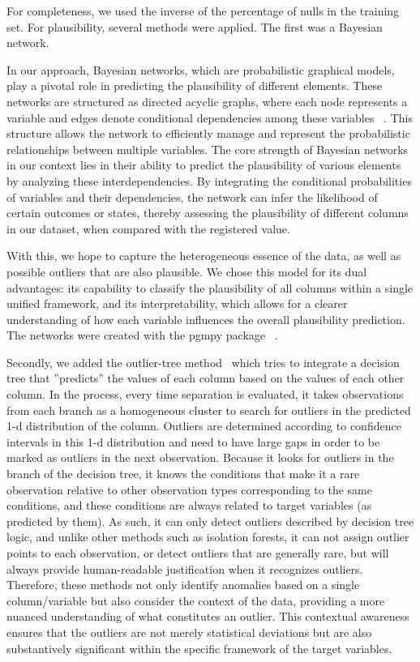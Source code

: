 For completeness, we used the inverse of the percentage of nulls in the training set. For plausibility, several methods were applied. The first was a Bayesian network. 

In our approach, Bayesian networks, which are probabilistic graphical models, play a pivotal role in predicting the plausibility of different elements. These networks are structured as directed acyclic graphs, where each node represents a variable and edges denote conditional dependencies among these variables \unskip~\cite{pearl1988probabilistic}. This structure allows the network to efficiently manage and represent the probabilistic relationships between multiple variables. The core strength of Bayesian networks in our context lies in their ability to predict the plausibility of various elements by analyzing these interdependencies. By integrating the conditional probabilities of variables and their dependencies, the network can infer the likelihood of certain outcomes or states, thereby assessing the plausibility of different columns in our dataset, when compared with the registered value. 

With this, we hope to capture the heterogeneous essence of the data, as well as possible outliers that are also plausible. We chose this model for its dual advantages: its capability to classify the plausibility of all columns within a single unified framework, and its interpretability, which allows for a clearer understanding of how each variable influences the overall plausibility prediction. The networks were created with the pgmpy package \unskip~\cite{pgmpy}. 

Secondly, we added the outlier-tree method\unskip~\cite{cortesExplainableOutlierDetection2020} which tries to integrate a decision tree that ''predicts'' the values of each column based on the values of each other column. In the process, every time separation is evaluated, it takes observations from each branch as a homogeneous cluster to search for outliers in the predicted 1-d distribution of the column. Outliers are determined according to confidence intervals in this 1-d distribution and need to have large gaps in order to be marked as outliers in the next observation. Because it looks for outliers in the branch of the decision tree, it knows the conditions that make it a rare observation relative to other observation types corresponding to the same conditions, and these conditions are always related to target variables (as predicted by them).  As such, it can only detect outliers described by decision tree logic, and unlike other methods such as isolation forests, it can not assign outlier points to each observation, or detect outliers that are generally rare, but will always provide human-readable justification when it recognizes outliers. Therefore, these methods not only identify anomalies based on a single column/variable but also consider the context of the data, providing a more nuanced understanding of what constitutes an outlier. This contextual awareness ensures that the outliers are not merely statistical deviations but are also substantively significant within the specific framework of the target variables. 


